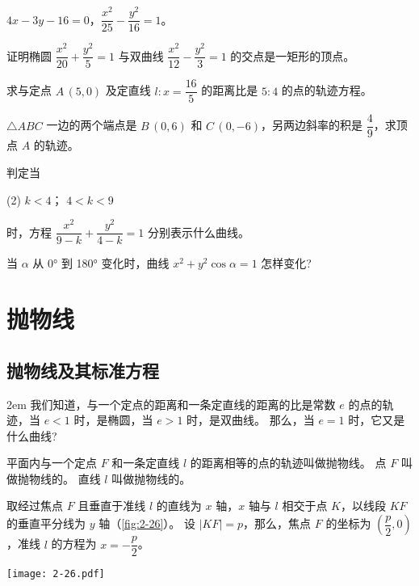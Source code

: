 \begin{Exercise}
\begin{question}
\begin{tasks}
      \task $4x-3y-16=0$，$\dfrac{x^2}{25}-\dfrac{y^2}{16}=1$。
    \end{tasks}
    \item 证明椭圆 $\dfrac{x^2}{20}+\dfrac{y^2}{5}=1$ 与双曲线 $\dfrac{x^2}{12} - \dfrac{y^2}{3}=1$ 的交点是一矩形的顶点。
    \item 求与定点 $A\,(5,0)$ 及定直线 $l:x=\dfrac{16}{5}$ 的距离比是 $5:4$ 的点的轨迹方程。
    \item $\triangle ABC$ 一边的两个端点是 $B\,(0,6)$ 和 $C\,(0,-6)$，另两边斜率的积是 $\dfrac{4}{9}$，求顶点 $A$ 的轨迹。
    \item 判定当 
    \begin{tasks}(2)
      \task $k<4$；
      \task $4<k<9$
    \end{tasks}
    时，方程 $\dfrac{x^2}{9-k}+\dfrac{y^2}{4-k}=1$ 分别表示什么曲线。\par\medskip
    \item 当 $\alpha$ 从 \ang{0} 到 \ang{180} 变化时，曲线 $x^2+y^2\cos\alpha=1$ 怎样变化?
  \end{question}
\end{Exercise}

\section{抛物线}
\subsection{抛物线及其标准方程}
\medskip\noindent
\begin{minipage}{0.7\linewidth}\parindent2em
我们知道，与一个定点的距离和一条定直线的距离的比是常数 $e$ 的点的轨迹，当 $e<1$ 时，是椭圆，当 $e>1$ 时，是双曲线。
那么，当 $e=1$ 时，它又是什么曲线?

平面内与一个定点 $F$ 和一条定直线 $l$ 的距离相等的点的轨迹叫做抛物线。
点 $F$ 叫做抛物线的。
直线 $l$ 叫做抛物线的。

取经过焦点 $F$ 且垂直于准线 $l$ 的直线为 $x$ 轴，$x$ 轴与 $l$ 相交于点 $K$，以线段 $KF$ 的垂直平分线为 $y$ 轴（\cref{fig:2-26}）。
设 $|KF|=p$，那么，焦点 $F$ 的坐标为 $\left(\dfrac{p}{2},0\right)$，准线 $l$ 的方程为 $x=-\dfrac{p}{2}$。
\end{minipage}\hfill
\begin{minipage}{0.25\linewidth}
\begin{figurehere}
  \texttt{[image: 2-26.pdf]}
  \caption{}\label{fig:2-26}
\end{figurehere}
\end{minipage}

